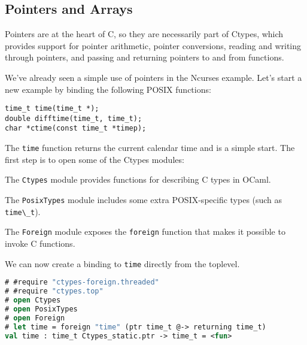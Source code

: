 \hypertarget{pointers-and-arrays}{%
\subsection{Pointers and Arrays}\label{pointers-and-arrays}}

Pointers are at the heart of C, so they are necessarily part of Ctypes,
which provides support for pointer arithmetic, pointer conversions,
reading and writing through pointers, and passing and returning pointers
to and from
functions.

We've already seen a simple use of pointers in the Ncurses example.
Let's start a new example by binding the following POSIX functions:

\begin{lstlisting}
time_t time(time_t *);
double difftime(time_t, time_t);
char *ctime(const time_t *timep);
\end{lstlisting}

The \passthrough{\lstinline!time!} function returns the current calendar
time and is a simple start. The first step is to open some of the Ctypes
modules:

\begin{description}
\tightlist
\item[\texttt{Ctypes}]
The \passthrough{\lstinline!Ctypes!} module provides functions for
describing C types in OCaml.
\item[\texttt{PosixTypes}]
The \passthrough{\lstinline!PosixTypes!} module includes some extra
POSIX-specific types (such as \passthrough{\lstinline!time\_t!}).
\item[\texttt{Foreign}]
The \passthrough{\lstinline!Foreign!} module exposes the
\passthrough{\lstinline!foreign!} function that makes it possible to
invoke C functions.
\end{description}

We can now create a binding to \passthrough{\lstinline!time!} directly
from the toplevel.

\begin{lstlisting}[language=Caml]
# #require "ctypes-foreign.threaded"
# #require "ctypes.top"
# open Ctypes
# open PosixTypes
# open Foreign
# let time = foreign "time" (ptr time_t @-> returning time_t)
val time : time_t Ctypes_static.ptr -> time_t = <fun>
\end{lstlisting}

